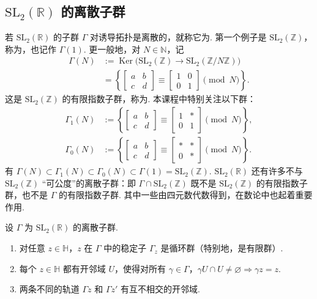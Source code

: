 \subsection{$\mathrm{SL}_2(\mathbb R)$ 的离散子群}\label{sec:modular-1-1-2}
若 $\mathrm{SL}_2(\mathbb R)$ 的子群 $\Gamma$ 对诱导拓扑是离散的，就称它为. 第一个例子是 $\mathrm{SL}_2(\mathbb Z)$，称为，也记作 $\Gamma(1)$. 更一般地，对 $N\in\mathbb N$，记
\begin{align*}
\Gamma(N)&:=\operatorname{Ker}\bigl(\mathrm{SL}_2(\mathbb Z)\to\mathrm{SL}_2(\mathbb Z/N\mathbb Z)\bigr)\\
&=\left\{\begin{bmatrix}a&b\\c&d\end{bmatrix}\equiv\begin{bmatrix}1&0\\0&1\end{bmatrix}\pmod N\right\}.
\end{align*}
这是 $\mathrm{SL}_2(\mathbb Z)$ 的有限指数子群，称为. 本课程中特别关注以下群：
\begin{align*}
\Gamma_1(N)&:=\left\{\begin{bmatrix}a&b\\c&d\end{bmatrix}\equiv\begin{bmatrix}1&*\\0&1\end{bmatrix}\pmod N\right\},\\
\Gamma_0(N)&:=\left\{\begin{bmatrix}a&b\\c&d\end{bmatrix}\equiv\begin{bmatrix}*&*\\0&*\end{bmatrix}\pmod N\right\}.
\end{align*}
有 $\Gamma(N)\subset\Gamma_1(N)\subset\Gamma_0(N)\subset\Gamma(1)=\mathrm{SL}_2(\mathbb Z)$.
$\mathrm{SL}_2(\mathbb R)$ 还有许多不与 $\mathrm{SL}_2(\mathbb Z)$ ``可公度''的离散子群：即 $\Gamma\cap\mathrm{SL}_2(\mathbb Z)$ 既不是 $\mathrm{SL}_2(\mathbb Z)$ 的有限指数子群，也不是 $\Gamma$ 的有限指数子群. 其中一些由四元数代数得到，在数论中也起着重要作用.
\begin{proposition*}\label{prop:modular-discrete-action}
设 $\Gamma$ 为 $\mathrm{SL}_2(\mathbb R)$ 的离散子群.
\begin{enumerate}[label=\roman*)]
\item 对任意 $z\in\mathbb H$，$z$ 在 $\Gamma$ 中的稳定子 $\Gamma_z$ 是循环群（特别地，是有限群）.
\item 每个 $z\in\mathbb H$ 都有开邻域 $U$，使得对所有 $\gamma\in\Gamma$，$\gamma U\cap U\ne\varnothing\Rightarrow\gamma z=z$.
\item 两条不同的轨道 $\Gamma z$ 和 $\Gamma z'$ 有互不相交的开邻域.
\end{enumerate}
\end{proposition*}
